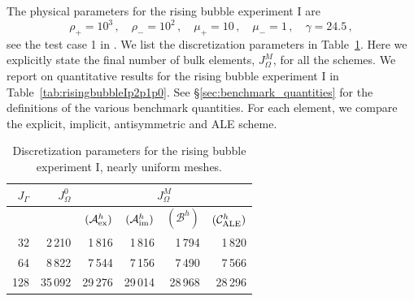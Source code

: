 \documentclass[a4paper,12pt,onecolumn]{article}
\newcommand{\schemeAex}{{\mathcal{A}^h_{\rm ex}}}
\newcommand{\schemeAim}{{\mathcal{A}^h_{\rm im}}}
\newcommand{\schemeB}{{\mathcal{B}^h}}
\newcommand{\schemeALE}{{\mathcal{C}^h_{\rm ALE}}}
\begin{document}
The physical parameters for the rising bubble experiment I are
\begin{equation} \label{eq:Hysing1}
\rho_+ = 10^3\,,\quad \rho_- = 10^2\,,\quad \mu_+ = 10\,,\quad \mu_- = 1\,,\quad
\gamma = 24.5\,,
\end{equation}
see the test case 1 in \cite[Table~I]{HysingTKPBGT09}. We list the
discretization parameters in Table~\ref{tab:risingbubble2Delements}. Here we
explicitly state the final number of bulk elements, $J_\Omega^M$, for all the
schemes. We report on quantitative results for the rising bubble experiment I
in Table~\ref{tab:risingbubbleIp2p1p0}. See \S\ref{sec:benchmark_quantities}
for the definitions of the various benchmark quantities. For each element, we
compare the explicit, implicit, antisymmetric and ALE scheme.
\begin{table}
\center
\begin{tabular}{rrrrrr}
\hline
$J_\Gamma$ & $J_\Omega^0$ & \multicolumn{4}{c}{$J_\Omega^M$} \\ \hline
& & $(\schemeAex)$ & $(\schemeAim)$ & $(\schemeB)$ & $(\schemeALE)$ \\
\hline
 32 &  2\,210 &  1\,816 &  1\,816 &  1\,794 &  1\,820 \\
 64 &  8\,822 &  7\,544 &  7\,156 &  7\,490 &  7\,566 \\
128 & 35\,092 & 29\,276 & 29\,014 & 28\,968 & 28\,296 \\
\hline
\end{tabular}
\caption[Navier--Stokes rising bubble I meshes parameters]
{Discretization parameters for the rising bubble experiment I, nearly uniform
meshes.}
\label{tab:risingbubble2Delements}
\end{table}
\end{document}
